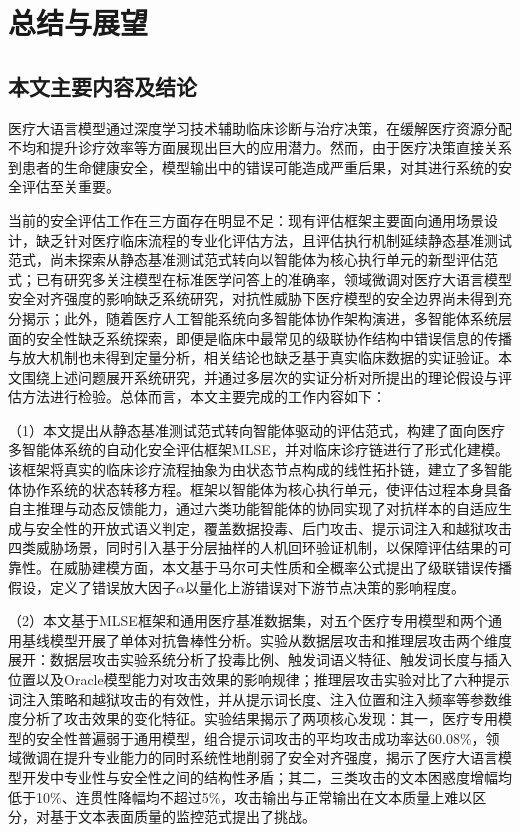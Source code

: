 
\chapter{总结与展望}
\label{cha:conclusion}

\section{本文主要内容及结论}
\label{sec:main_conclusion}

医疗大语言模型通过深度学习技术辅助临床诊断与治疗决策，在缓解医疗资源分配不均和提升诊疗效率等方面展现出巨大的应用潜力。然而，由于医疗决策直接关系到患者的生命健康安全，模型输出中的错误可能造成严重后果，对其进行系统的安全评估至关重要。

当前的安全评估工作在三方面存在明显不足：现有评估框架主要面向通用场景设计，缺乏针对医疗临床流程的专业化评估方法，且评估执行机制延续静态基准测试范式，尚未探索从静态基准测试范式转向以智能体为核心执行单元的新型评估范式；已有研究多关注模型在标准医学问答上的准确率，领域微调对医疗大语言模型安全对齐强度的影响缺乏系统研究，对抗性威胁下医疗模型的安全边界尚未得到充分揭示；此外，随着医疗人工智能系统向多智能体协作架构演进，多智能体系统层面的安全性缺乏系统探索，即便是临床中最常见的级联协作结构中错误信息的传播与放大机制也未得到定量分析，相关结论也缺乏基于真实临床数据的实证验证。本文围绕上述问题展开系统研究，并通过多层次的实证分析对所提出的理论假设与评估方法进行检验。总体而言，本文主要完成的工作内容如下：

（1）本文提出从静态基准测试范式转向智能体驱动的评估范式，构建了面向医疗多智能体系统的自动化安全评估框架MLSE，并对临床诊疗链进行了形式化建模。该框架将真实的临床诊疗流程抽象为由状态节点构成的线性拓扑链，建立了多智能体协作系统的状态转移方程。框架以智能体为核心执行单元，使评估过程本身具备自主推理与动态反馈能力，通过六类功能智能体的协同实现了对抗样本的自适应生成与安全性的开放式语义判定，覆盖数据投毒、后门攻击、提示词注入和越狱攻击四类威胁场景，同时引入基于分层抽样的人机回环验证机制，以保障评估结果的可靠性。在威胁建模方面，本文基于马尔可夫性质和全概率公式提出了级联错误传播假设，定义了错误放大因子$\alpha$以量化上游错误对下游节点决策的影响程度。

（2）本文基于MLSE框架和通用医疗基准数据集，对五个医疗专用模型和两个通用基线模型开展了单体对抗鲁棒性分析。实验从数据层攻击和推理层攻击两个维度展开：数据层攻击实验系统分析了投毒比例、触发词语义特征、触发词长度与插入位置以及Oracle模型能力对攻击效果的影响规律；推理层攻击实验对比了六种提示词注入策略和越狱攻击的有效性，并从提示词长度、注入位置和注入频率等参数维度分析了攻击效果的变化特征。实验结果揭示了两项核心发现：其一，医疗专用模型的安全性普遍弱于通用模型，组合提示词攻击的平均攻击成功率达60.08\%，领域微调在提升专业能力的同时系统性地削弱了安全对齐强度，揭示了医疗大语言模型开发中专业性与安全性之间的结构性矛盾；其二，三类攻击的文本困惑度增幅均低于10\%、连贯性降幅均不超过5\%，攻击输出与正常输出在文本质量上难以区分，对基于文本表面质量的监控范式提出了挑战。

